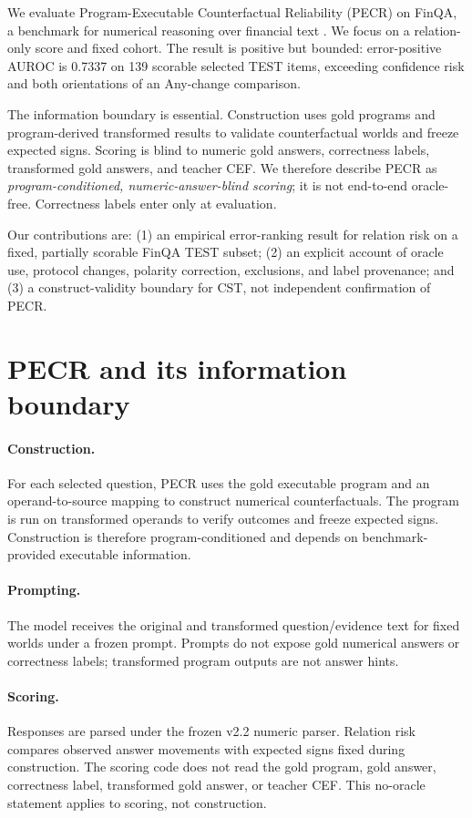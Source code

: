 \documentclass[11pt]{article}
\begin{document}
We evaluate Program-Executable Counterfactual Reliability (PECR) on FinQA, a benchmark for numerical reasoning over financial text \citep{chen-etal-2021-finqa}. We focus on a relation-only score and fixed cohort. The result is positive but bounded: error-positive AUROC is 0.7337 on 139 scorable selected TEST items, exceeding confidence risk and both orientations of an Any-change comparison.

The information boundary is essential. Construction uses gold programs and program-derived transformed results to validate counterfactual worlds and freeze expected signs. Scoring is blind to numeric gold answers, correctness labels, transformed gold answers, and teacher CEF. We therefore describe PECR as \emph{program-conditioned, numeric-answer-blind scoring}; it is not end-to-end oracle-free. Correctness labels enter only at evaluation.

Our contributions are: (1) an empirical error-ranking result for relation risk on a fixed, partially scorable FinQA TEST subset; (2) an explicit account of oracle use, protocol changes, polarity correction, exclusions, and label provenance; and (3) a construct-validity boundary for CST, not independent confirmation of PECR.

\section{PECR and its information boundary}
\paragraph{Construction.} For each selected question, PECR uses the gold executable program and an operand-to-source mapping to construct numerical counterfactuals. The program is run on transformed operands to verify outcomes and freeze expected signs. Construction is therefore program-conditioned and depends on benchmark-provided executable information.
\paragraph{Prompting.} The model receives the original and transformed question/evidence text for fixed worlds under a frozen prompt. Prompts do not expose gold numerical answers or correctness labels; transformed program outputs are not answer hints.
\paragraph{Scoring.} Responses are parsed under the frozen v2.2 numeric parser. Relation risk compares observed answer movements with expected signs fixed during construction. The scoring code does not read the gold program, gold answer, correctness label, transformed gold answer, or teacher CEF. This no-oracle statement applies to scoring, not construction.
\end{document}
